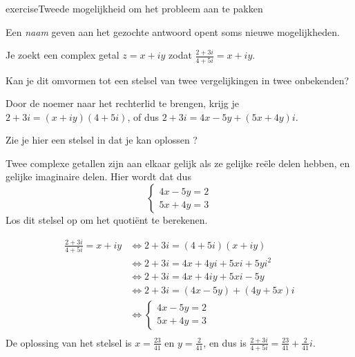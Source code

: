 \documentclass{ximera}
\begin{document}
{    \begin{expandable}{exercise}{Tweede mogelijkheid om het probleem aan te pakken}
        
        Een \textit{naam} geven aan het gezochte antwoord opent soms nieuwe mogelijkheden.

        \begin{hint} Je zoekt een complex getal $z=x+iy$ zodat 
            $
            \frac{2+3i}{4+5i} = x+iy
            $.

            Kan je dit omvormen tot een stelsel van twee vergelijkingen in twee onbekenden?
        \end{hint}
        \begin{hint} Door de noemer naar het rechterlid te brengen, krijg je
            $2+3i = (x+iy)(4+5i)$, of dus $2+3i = 4x-5y + (5x+4y)i$.

            Zie je hier een stelsel in dat je kan oplossen ?
        \end{hint}
        \begin{hint} Twee complexe getallen zijn aan elkaar gelijk als ze gelijke reële delen hebben, en gelijke imaginaire delen.
            Hier wordt dat dus
                $$
                \begin{cases}
                    4x - 5y = 2   \\
                    5x + 4y = 3
                \end{cases}
                $$
                Los dit stelsel op om het quotiënt te berekenen.
            \end{hint}
        \begin{oplossing}
                \begin{align*}
                   \frac{2+3i}{4+5i} = x+iy & \iff 2+3i = (4+5i)(x+iy) \\
                                            & \iff 2+3i = 4x+4yi + 5xi + 5yi^2  \\
                                            & \iff 2+3i = 4x+4iy + 5xi - 5y  \\
                                            & \iff 2+3i = (4x - 5y) + (4y + 5x)i   \\
                                            & \iff \begin{cases}
                                                 4x - 5y = 2   \\
                                                 5x + 4y = 3
                                                    \end{cases} \\
                \end{align*}
                De oplossing van het stelsel is $x=\frac{23}{41}$ en $y=\frac{2}{41}$, en dus is 
                $
                \frac{2+3i}{4+5i} = \frac{23}{41} + \frac{2}{41}i
                $.


\end{oplossing}
\end{expandable}}
\end{document}
